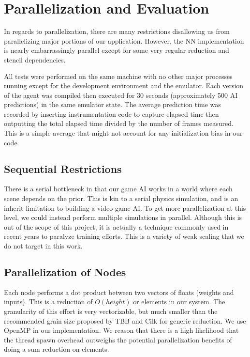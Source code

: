 \section*{Parallelization and Evaluation}

\label{parallel}
In regards to parallelization, there are many restrictions disallowing us from parallelizing major portions of our application.
However, the NN implementation is nearly embarrassingly parallel except for some very regular reduction and stencil dependencies.

All tests were performed on the same machine with no other major processes running except for the development environment and the emulator.
Each version of the agent was compiled then executed for 30 seconds (approximately 500 AI predictions) in the same emulator state.
The average prediction time was recorded by inserting instrumentation code to capture elapsed time then outputting the total elapsed time divided by the number of frames measured.
This is a simple average that might not account for any initialization bias in our code.

\subsection*{Sequential Restrictions}
There is a serial bottleneck in that our game AI works in a world where each scene depends on the prior.
This is kin to a serial physics simulation, and is an inherit limitation to building a video game AI.
To get more parallelization at this level, we could instead perform multiple simulations in parallel.
Although this is out of the scope of this project, it is actually a technique commonly used in recent years to paralyze training efforts.
This is a variety of weak scaling that we do not target in this work.

\subsection*{Parallelization of Nodes}
Each node performs a dot product between two vectors of \netheight floats (weights and inputs).
This is a reduction of $O(height)$ or \netheight elements in our system.
The granularity of this effort is very vectorizable, but much smaller than the recommended grain size proposed by TBB and Cilk for generic reduction.
We use OpenMP in our implementation. 
We reason that there is a high likelihood that the thread spawn overhead outweighs the potential parallelization benefits of doing a sum reduction on \netheight elements.

